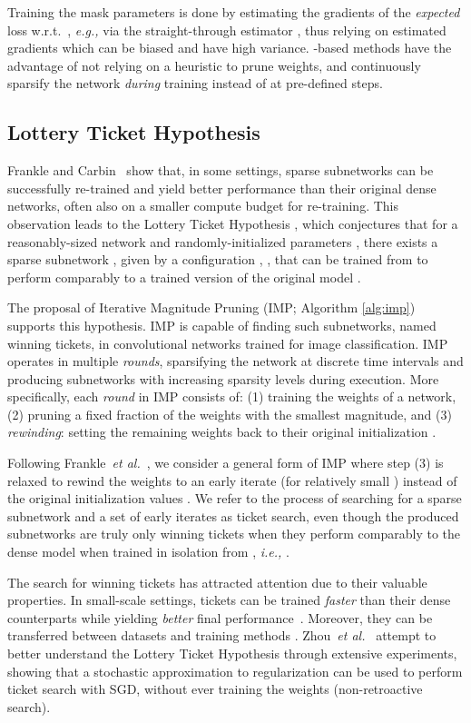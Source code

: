 \documentclass{article}
\newcommand{\citep}[1]{\cite{#1}}
\newcommand{\citet}[1]{\cite{#1}}
\newcommand{\ie}{\textit{i.e.,} }
\newcommand{\eg}{\textit{e.g.,} }
\newcommand{\etal}{\textit{et al.}}
\begin{document}
Training the mask parameters  is done by estimating the gradients of the \emph{expected} loss w.r.t.~, \eg via the straight-through estimator \cite{straightthrough}, thus relying on estimated gradients which can be biased and have high variance. -based methods have the advantage of not relying on a heuristic to prune weights, and continuously sparsify the network \emph{during} training instead of at pre-defined steps.

\subsection{Lottery Ticket Hypothesis}
Frankle and Carbin~\cite{lth} show that, in some settings, sparse subnetworks can be successfully re-trained and yield better performance than their original dense networks, often also on a smaller compute budget for re-training. This observation leads to the Lottery Ticket Hypothesis \citep{lth}, which conjectures that for a reasonably-sized network  and randomly-initialized parameters , there exists a sparse subnetwork , given by a configuration , , that can be trained from  to perform comparably to a trained version of the original model .

The proposal of Iterative Magnitude Pruning (IMP; Algorithm \ref{alg:imp}) \citep{lth2} supports this hypothesis.  IMP is capable of finding such subnetworks, named winning tickets, in convolutional networks trained for image classification. IMP operates in multiple \textit{rounds}, sparsifying the network at discrete time intervals and producing subnetworks with increasing sparsity levels during execution. More specifically, each \textit{round} in IMP consists of: (1) training the weights  of a network, (2) pruning a fixed fraction of the weights with the smallest magnitude, and (3) \textit{rewinding}: setting the remaining weights back to their original initialization .

Following Frankle~\etal~\cite{lth2}, we consider a general form of IMP where step (3) is relaxed to rewind the weights to an early iterate  (for relatively small ) instead of the original initialization values . We refer to the process of searching for a sparse subnetwork and a set of early iterates  as ticket search, even though the produced subnetworks are truly only winning tickets when they perform comparably to the dense model when trained in isolation from , \ie .

The search for winning tickets has attracted attention due to their valuable properties. In small-scale settings, tickets can be trained \emph{faster} than their dense counterparts while yielding \emph{better} final performance~\cite{lth}. Moreover, they can be transferred between datasets \citep{transfertickets, transtickets2} and training methods \citep{generaltickets}. Zhou~\etal~\citet{deconstructing} attempt to better understand the Lottery Ticket Hypothesis through extensive experiments, showing that a stochastic approximation to  regularization can be used to perform ticket search with SGD, without ever training the weights (non-retroactive search).
\end{document}
